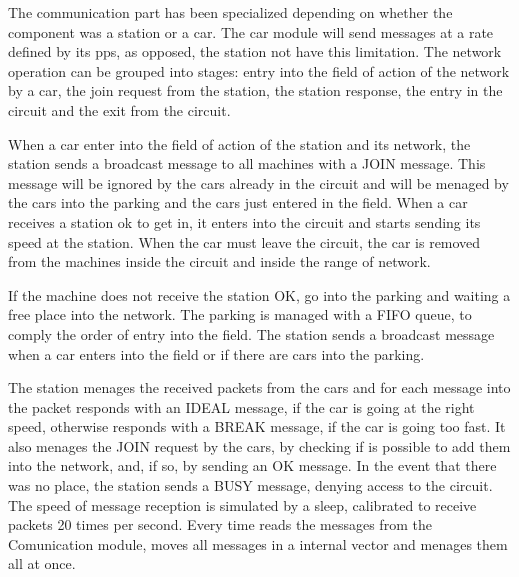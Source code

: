 \documentclass[a4paper,titlepage]{article}
\begin{document}
The communication part has been specialized depending on whether the component was a station or a car. The car module will send messages at a rate defined by its pps, as opposed, the station not have this limitation. 
The network operation can be grouped into stages: entry into the field of action of the network by a car, the join request from the station, the station response, the entry in the circuit and the exit from the circuit.

When a car enter into the field of action of the station and its network, the station sends a broadcast message to all machines with a JOIN message. This message will be ignored by the cars already in the circuit and will be menaged by the cars into the parking and the cars just entered in the field. When a car receives a station ok to get in, it enters into the circuit and starts sending its speed at the station. When the car must leave the circuit, the car is removed from the machines inside the circuit and inside the range of network.

If the machine does not receive the station OK, go into the parking and waiting a free place into the network.
The parking is managed with a FIFO queue, to comply the order of entry into the field.
The station sends a broadcast message when a car enters into the field or if there are cars into the parking.

The station menages the received packets from the cars and for each message into the packet responds with an IDEAL message, if the car is going at the right speed, otherwise responds with a BREAK message, if the car is going too fast.
It also menages the JOIN request by the cars, by checking if is possible to add them into the network, and, if so, by sending an OK message. In the event that there was no place, the station sends a BUSY message, denying access to the circuit.
The speed of message reception is simulated by a sleep, calibrated to receive packets 20 times per second. Every time reads the messages from the Comunication module, moves all messages in a internal vector and menages them all at once.
\end{document}
